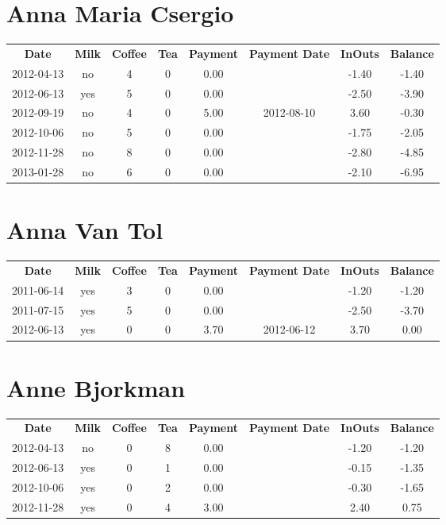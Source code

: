 \section{Anna Maria Csergio}

\begin{center}
\begin{tabular}{cccccccc}
\textbf{Date} & \textbf{Milk} & \textbf{Coffee} & \textbf{Tea} & \textbf{Payment} & \textbf{Payment Date} & \textbf{InOuts} & \textbf{Balance} \\
2012-04-13 & no & 4 & 0 & 0.00 &  & -1.40 & -1.40\\ 
2012-06-13 & yes & 5 & 0 & 0.00 &  & -2.50 & -3.90\\ 
2012-09-19 & no & 4 & 0 & 5.00 & 2012-08-10 &  3.60 & -0.30\\ 
2012-10-06 & no & 5 & 0 & 0.00 &  & -1.75 & -2.05\\ 
2012-11-28 & no & 8 & 0 & 0.00 &  & -2.80 & -4.85\\ 
2013-01-28 & no & 6 & 0 & 0.00 &  & -2.10 & -6.95
\end{tabular}
\end{center}

\section{Anna Van Tol}

\begin{center}
\begin{tabular}{cccccccc}
\textbf{Date} & \textbf{Milk} & \textbf{Coffee} & \textbf{Tea} & \textbf{Payment} & \textbf{Payment Date} & \textbf{InOuts} & \textbf{Balance} \\
2011-06-14 & yes & 3 & 0 & 0.00 &  & -1.20 & -1.20\\ 
2011-07-15 & yes & 5 & 0 & 0.00 &  & -2.50 & -3.70\\ 
2012-06-13 & yes & 0 & 0 & 3.70 & 2012-06-12 &  3.70 &  0.00
\end{tabular}
\end{center}

\section{Anne Bjorkman}

\begin{center}
\begin{tabular}{cccccccc}
\textbf{Date} & \textbf{Milk} & \textbf{Coffee} & \textbf{Tea} & \textbf{Payment} & \textbf{Payment Date} & \textbf{InOuts} & \textbf{Balance} \\
2012-04-13 & no & 0 & 8 & 0.00 &  & -1.20 & -1.20\\ 
2012-06-13 & yes & 0 & 1 & 0.00 &  & -0.15 & -1.35\\ 
2012-10-06 & yes & 0 & 2 & 0.00 &  & -0.30 & -1.65\\ 
2012-11-28 & yes & 0 & 4 & 3.00 &  &  2.40 &  0.75
\end{tabular}
\end{center}


